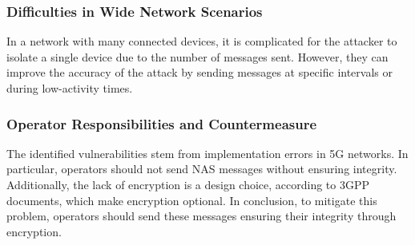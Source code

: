 \documentclass[english]{article}
\begin{document}
\subsubsection{Difficulties in Wide Network Scenarios}
In a network with many connected devices, it is complicated for the attacker to
isolate a single device due to the number of messages sent. However, they can
improve the accuracy of the attack by sending messages at specific intervals or
during low-activity times.

\subsubsection{Operator Responsibilities and Countermeasure}
The identified vulnerabilities stem from implementation errors in 5G networks.
In particular, operators should not send NAS messages without ensuring
integrity. Additionally, the lack of encryption is a design choice, according
to 3GPP documents, which make encryption optional. In conclusion, to mitigate
this problem, operators should send these messages ensuring their integrity
through encryption.
\end{document}
